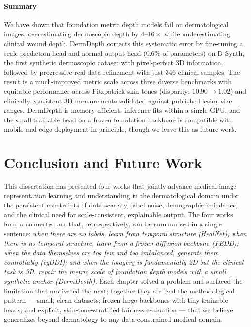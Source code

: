 \documentclass[11pt]{ucthesis}
\begin{document}
\subsubsection{Summary}\label{sec:dd_summary}
We have shown that foundation metric depth models fail on dermatological images, overestimating dermoscopic depth by $4$--$16\times$ while underestimating clinical wound depth. DermDepth corrects this systematic error by fine-tuning a scale prediction head and normal output head (0.6\% of parameters) on D-Synth, the first synthetic dermoscopic dataset with pixel-perfect 3D information, followed by progressive real-data refinement with just 346 clinical samples. The result is a much-improved metric scale across three diverse benchmarks with equitable performance across Fitzpatrick skin tones (disparity: $10.90 \rightarrow 1.02$) and clinically consistent 3D measurements validated against published lesion size ranges. DermDepth is memory-efficient: inference fits within a single GPU, and the small trainable head on a frozen foundation backbone is compatible with mobile and edge deployment in principle, though we leave this as future work.

\chapter{Conclusion and Future Work}\label{section:conclusion}

This dissertation has presented four works that jointly advance medical image representation learning and understanding in the dermatological domain under the persistent constraints of data scarcity, label noise, demographic imbalance, and the clinical need for scale-consistent, explainable output. The four works form a connected arc that, retrospectively, can be summarised in a single sentence: \emph{when there are no labels, learn from temporal structure (HealNet); when there is no temporal structure, learn from a frozen diffusion backbone (FEDD); when the data themselves are too few and too imbalanced, generate them controllably (cgDDI); and when the imagery is fundamentally 2D but the clinical task is 3D, repair the metric scale of foundation depth models with a small synthetic anchor (DermDepth).} Each chapter solved a problem and surfaced the limitation that motivated the next; together they realized the methodological pattern --- small, clean datasets; frozen large backbones with tiny trainable heads; and explicit, skin-tone-stratified fairness evaluation --- that we believe generalizes beyond dermatology to any data-constrained medical domain.
\end{document}
